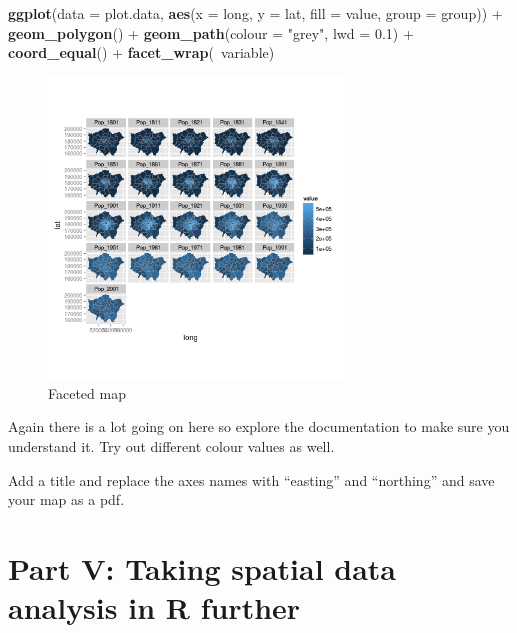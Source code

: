 \documentclass[]{article}
\newenvironment{Shaded}{}{}
\newcommand{\KeywordTok}[1]{\textcolor[rgb]{0.00,0.44,0.13}{\textbf{{#1}}}}
\newcommand{\DataTypeTok}[1]{\textcolor[rgb]{0.56,0.13,0.00}{{#1}}}
\newcommand{\FloatTok}[1]{\textcolor[rgb]{0.25,0.63,0.44}{{#1}}}
\newcommand{\StringTok}[1]{\textcolor[rgb]{0.25,0.44,0.63}{{#1}}}
\newcommand{\NormalTok}[1]{{#1}}
\let\Oldincludegraphics\includegraphics
\renewcommand{\includegraphics}[1]{\Oldincludegraphics[width=8cm]{#1}}
\begin{document}
\begin{Shaded}
\begin{Highlighting}[]
\KeywordTok{ggplot}\NormalTok{(}\DataTypeTok{data =} \NormalTok{plot.data, }\KeywordTok{aes}\NormalTok{(}\DataTypeTok{x =} \NormalTok{long, }\DataTypeTok{y =} \NormalTok{lat, }\DataTypeTok{fill =} \NormalTok{value, }\DataTypeTok{group =} \NormalTok{group)) + }
    \KeywordTok{geom_polygon}\NormalTok{() + }\KeywordTok{geom_path}\NormalTok{(}\DataTypeTok{colour =} \StringTok{"grey"}\NormalTok{, }\DataTypeTok{lwd =} \FloatTok{0.1}\NormalTok{) + }\KeywordTok{coord_equal}\NormalTok{() + }
    \KeywordTok{facet_wrap}\NormalTok{(~variable)}
\end{Highlighting}
\end{Shaded}
\begin{figure}[htbp]
\centering
\includegraphics{figure/Faceted_map.png}
\caption{Faceted map}
\end{figure}

Again there is a lot going on here so explore the documentation to make
sure you understand it. Try out different colour values as well.

Add a title and replace the axes names with ``easting'' and ``northing''
and save your map as a pdf.

\section{Part V: Taking spatial data analysis in R further}
\end{document}
